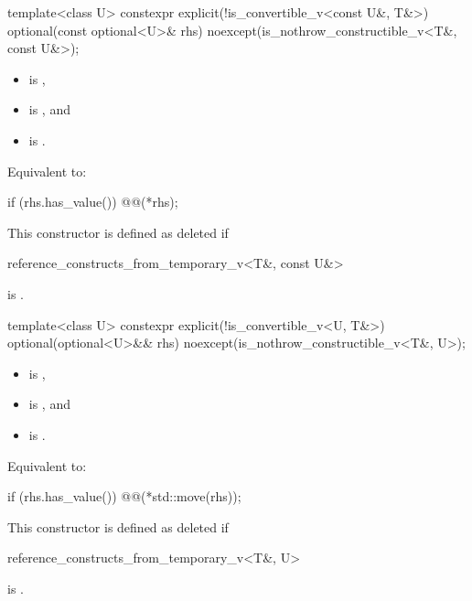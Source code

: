 \begin{itemdecl}
template<class U>
  constexpr explicit(!is_convertible_v<const U&, T&>)
  optional(const optional<U>& rhs) noexcept(is_nothrow_constructible_v<T&, const U&>);
\end{itemdecl}

\begin{itemdescr}
\pnum
\constraints
\begin{itemize}
\item {} is ,
\item {} is , and
\item {} is .
\end{itemize}

\pnum
\effects
Equivalent to:
\begin{codeblock}
if (rhs.has_value()) @@(*rhs);
\end{codeblock}

\pnum
\remarks
This constructor is defined as deleted if
\begin{codeblock}
reference_constructs_from_temporary_v<T&, const U&>
\end{codeblock}
is .
\end{itemdescr}

\begin{itemdecl}
template<class U>
  constexpr explicit(!is_convertible_v<U, T&>)
  optional(optional<U>&& rhs) noexcept(is_nothrow_constructible_v<T&, U>);
\end{itemdecl}

\begin{itemdescr}
\pnum
\constraints
\begin{itemize}
\item {} is ,
\item {} is , and
\item {} is .
\end{itemize}

\pnum
\effects
Equivalent to:
\begin{codeblock}
if (rhs.has_value()) @@(*std::move(rhs));
\end{codeblock}

\pnum
\remarks
This constructor is defined as deleted if
\begin{codeblock}
reference_constructs_from_temporary_v<T&, U>
\end{codeblock}
is .
\end{itemdescr}

